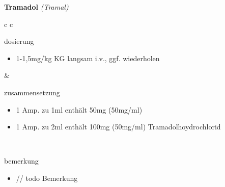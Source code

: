 \begin{frame}{
    \textbf{Tramadol}
    \textit{(Tramal)}
}
    \begin{tabular}{c c}
        \begin{beamercolorbox}[wd=\boxwidth\textwidth,ht=\boxheight\textheight,sep=1em]{dosierung}
            \begin{itemize}
                \item 1-1,5mg/kg KG langsam i.v., ggf. wiederholen
            \end{itemize}
        \end{beamercolorbox} & 
        \begin{beamercolorbox}[wd=\boxwidth\textwidth,ht=\boxheight\textheight,sep=1em]{zusammensetzung}
            \begin{itemize}
                \item 1 Amp. zu 1ml enthält 50mg (50mg/ml)
                \item 1 Amp. zu 2ml enthält 100mg (50mg/ml) Tramadolhoydrochlorid
            \end{itemize}
        \end{beamercolorbox} \\
        \begin{beamercolorbox}[wd=\textwidth,ht=\boxheight\textheight,sep=1em]{bemerkung}
            \begin{itemize}
                \item // todo Bemerkung
            \end{itemize}
        \end{beamercolorbox} \\
    \end{tabular}
\end{frame}

